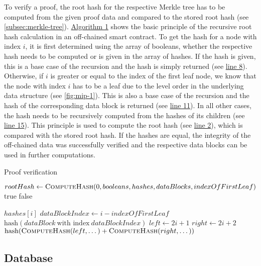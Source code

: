 			To verify a proof, the root hash for the respective Merkle tree has to be computed from the given proof data and compared to the stored root hash (see \autoref{subsec:merkle-tree}).
			\hyperref[alg:proof-verification]{Algorithm 1} shows the basic principle of the recursive root hash calculation in an off-chained smart contract.
			To get the hash for a node with index $i$, it is first determined using the array of booleans, whether the respective hash needs to be computed or is given in the array of hashes.
			If the hash is given, this is a base case of the recursion and the hash is simply returned (see \hyperref[algline:8]{line 8}).
			Otherwise, if $i$ is greater or equal to the index of the first leaf node, we know that the node with index $i$ has to be a leaf due to the level order in the underlying data structure (see \autoref{fig:mip-1}).
			This is also a base case of the recursion and the hash of the corresponding data block is returned (see \hyperref[algline:11]{line 11}).
			In all other cases, the hash needs to be recursively computed from the hashes of its children (see \hyperref[algline:15]{line 15}).
			This principle is used to compute the root hash (see \hyperref[algline:2]{line 2}), which is compared with the stored root hash.
			If the hashes are equal, the integrity of the off-chained data was successfully verified and the respective data blocks can be used in further computations.

			\begin{algorithm}
				\caption{Proof verification}
				\label{alg:proof-verification}

				\begin{algorithmic}[1]
						\State $rootHash \gets \Call{ComputeHash}{0, booleans, hashes, dataBlocks, indexOfFirstLeaf}$ \label{algline:2}
						 \Return true 
						\Else{} \Return false 
						\EndIf	
					\EndProcedure

					\State
						 
							\State \Return $hashes[i]$ \label{algline:8}
						 
							\State $dataBlockIndex \gets i - indexOfFirstLeaf$ 
							\State \Return $\textrm{hash}(dataBlock\ \textrm{with index}\ dataBlockIndex)$ \label{algline:11}
						\Else{} 
							\State $left \gets 2i + 1$ 
							\State $right \gets 2i + 2$ 
							\State \Return $\textrm{hash}(\Call{ComputeHash}{left, \dots} + \Call{ComputeHash}{right, \dots})$ \label{algline:15}
						\EndIf
					\EndProcedure
				\end{algorithmic}
			\end{algorithm}

	\subsection{Database}
	\label{subsec:approach-implementation-database}
